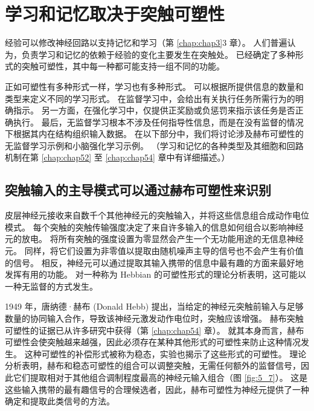 \section{学习和记忆取决于突触可塑性}
经验可以修改神经回路以支持记忆和学习（第 \ref{chap:chap3}3 章）。 
人们普遍认为，负责学习和记忆的依赖于经验的变化主要发生在突触处。 
已经确定了多种形式的突触可塑性，其中每一种都可能支持一组不同的功能。


正如可塑性有多种形式一样，学习也有多种形式。 
可以根据所提供信息的数量和类型来定义不同的学习形式。 
在监督学习中，会给出有关执行任务所需行为的明确指示。 
另一方面，在强化学习中，仅提供正奖励或负惩罚来指示该任务是否正确执行。 
最后，无监督学习根本不涉及任何指导性信息，而是在没有监督的情况下根据其内在结构组织输入数据。 
在以下部分中，我们将讨论涉及赫布可塑性的无监督学习示例和小脑强化学习示例。
（学习和记忆的各种类型及其细胞和回路机制在第 \ref{chap:chap52} 至 \ref{chap:chap54} 章中有详细描述。）


\subsection{突触输入的主导模式可以通过赫布可塑性来识别}
皮层神经元接收来自数千个其他神经元的突触输入，并将这些信息组合成动作电位模式。 
每个突触的突触传输强度决定了来自许多输入的信息如何组合以影响神经元的放电。
将所有突触的强度设置为零显然会产生一个无功能用途的无信息神经元。 
同样，将它们设置为非零值以提取由随机噪声主导的信号也不会产生有价值的信号。
相反，神经元可以通过提取其输入携带的信息中最有趣的方面来最好地发挥有用的功能。 
对一种称为 Hebbian 的可塑性形式的理论分析表明，这可能以一种无监督的方式发生。


1949 年，唐纳德·赫布 (Donald Hebb) 提出，当给定的神经元突触前输入与足够数量的协同输入合作，导致该神经元激发动作电位时，突触应该增强。 
赫布突触可塑性的证据已从许多研究中获得（第 \ref{chap:chap54} 章）。 
就其本身而言，赫布可塑性会使突触越来越强，因此必须存在某种其他形式的可塑性来防止这种情况发生。 
这种可塑性的补偿形式被称为稳态，实验也揭示了这些形式的可塑性。 
理论分析表明，赫布和稳态可塑性的组合可以调整突触，无需任何额外的监督信号，因此它们提取相对于其他组合调制程度最高的神经元输入组合（图 \ref{fig:5_7}）。 
这是这些输入携带的最有趣信号的合理候选者，因此，赫布可塑性为神经元提供了一种确定和提取此类信号的方法。

